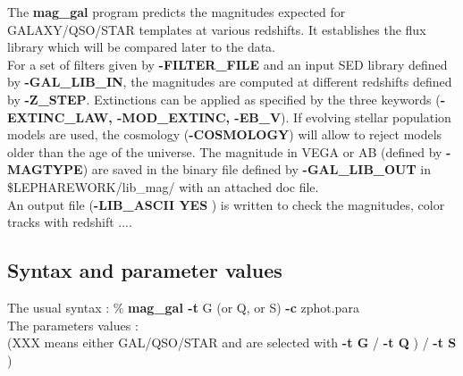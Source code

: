 \documentclass[12pt]{article}
\begin{document}
 The {\bf mag\_gal} program predicts the magnitudes expected for GALAXY/QSO/STAR templates at various redshifts. It establishes the flux library which will be compared later to the data.\\
 
%
For a set of filters given by {\bf -FILTER\_FILE} and an input SED library defined by {\bf -GAL\_LIB\_IN}, the magnitudes  are computed at different redshifts defined by {\bf -Z\_STEP}. Extinctions can be applied as specified by the three keywords ({\bf -EXTINC\_LAW,  -MOD\_EXTINC,  -EB\_V}). If evolving stellar population models are used, the cosmology ({\bf -COSMOLOGY}) will allow to reject models older than the age of the universe. The magnitude in VEGA or AB  (defined by {\bf -MAGTYPE}) are saved in the binary file defined by  {\bf -GAL\_LIB\_OUT}  in \$LEPHAREWORK/lib\_mag/  with an attached doc file.  \\
%
 An output file ({\bf -LIB\_ASCII YES }) is written to check the magnitudes, color tracks with redshift ....
%
\subsection{Syntax and parameter values}

 The usual syntax : $\%$ {\bf mag\_gal  -t} G (or Q, or S)  {\bf -c} zphot.para \\
%
 The parameters  values :\\
   (XXX means either GAL/QSO/STAR  and are selected with {\bf -t G}  / {\bf -t Q }) / {\bf -t S })\\

   
\end{document}
